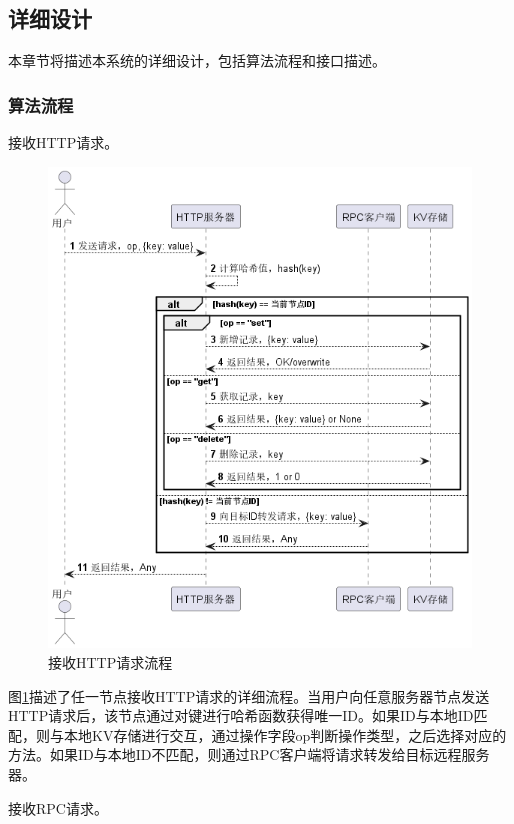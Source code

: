 \subsection{详细设计}

本章节将描述本系统的详细设计，包括算法流程和接口描述。

\subsubsection{算法流程}

接收HTTP请求。

\begin{figure}[H]
    \centering
    \includegraphics[width=0.8\linewidth]{examples/接收http流程.png}
    \caption{接收HTTP请求流程}
    \label{fig:recvhttp}
\end{figure}

图\ref{fig:recvhttp}描述了任一节点接收HTTP请求的详细流程。当用户向任意服务器节点发送HTTP请求后，该节点通过对键进行哈希函数获得唯一ID。如果ID与本地ID匹配，则与本地KV存储进行交互，通过操作字段op判断操作类型，之后选择对应的方法。如果ID与本地ID不匹配，则通过RPC客户端将请求转发给目标远程服务器。

接收RPC请求。

